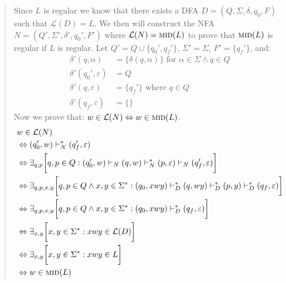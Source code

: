 \documentclass[a4paper]{article}
\newcommand{\Mid}{\textsc{mid}}
\newcommand{\eps}{\varepsilon}
\begin{document}
        \begin{quote}
            Since $L$ is regular we know that there exists a DFA $D = (Q, \Sigma, \delta, q_0, F)$ such that $\mathcal{L}(D)=L$. We then will construct the NFA $N = (Q', \Sigma', \delta', q_0', F')$ where $\mathcal{L}(N) = \Mid(L)$ to prove that $\Mid(L)$ is regular if $L$ is regular.
            \bigskip
            Let $Q' = Q \cup \{ q_0', q_f' \}$, $\Sigma' = \Sigma$, $F' = \{ q_f' \}$, and:
            \begin{align}
                   \delta'(q, \alpha) &= \{ \delta(q, \alpha) \} \text{ for } \alpha\in\Sigma \wedge q \in Q
                \\ \delta'(q_0', \eps) &= Q 
                \\ \delta'(q, \eps) &= \{ q_f' \} \text{ where }q \in Q
                \\ \delta'(q_f, \eps) &= \{ \}
            \end{align}
            Now we prove that: $w\in\mathcal{L}(N) \Leftrightarrow w\in\Mid(L)$.
            \begin{align}
                &w\in\mathcal{L}(N)
                \\&\Leftrightarrow (q_0', w)\vdash^*_N(q_f', \eps)
                \\&\Leftrightarrow \exists_{q, p}\bigg[ 
                    q, p \in Q :
                    (q_0', w) \vdash_N (q, w) \vdash_N^* (p, \eps) \vdash_N (q_f', \eps) 
                \bigg]
                \\&\Leftrightarrow \exists_{q, p, x, y}\bigg[ 
                    q, p \in Q \wedge x, y \in \Sigma^* :
                    (q_0, xwy) \vdash_D^* (q, wy) \vdash_D^* (p, y) \vdash_D^* (q_f, \eps) 
                \bigg]
                \\&\Leftrightarrow \exists_{q, p, x, y}\bigg[ 
                    q, p \in Q \wedge x, y \in \Sigma^* :
                    (q_0, xwy) \vdash_D^* (q_f, \eps) 
                \bigg]
                \\&\Leftrightarrow \exists_{x, y}\bigg[ 
                    x, y \in \Sigma^* : 
                    xwy \in \mathcal{L}(D)
                \bigg]
                \\&\Leftrightarrow \exists_{x, y}\bigg[ 
                    x, y \in \Sigma^* : 
                    xwy \in L
                \bigg]
                \\&\Leftrightarrow w\in\Mid(L)    
            \end{align}
        \end{quote}
\end{document}
